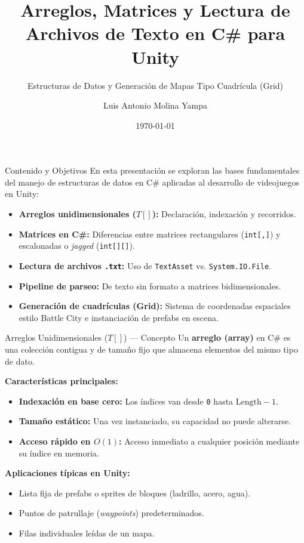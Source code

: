 \documentclass{beamer}
\title[Arreglos, Matrices y Archivos en C\#]{Arreglos, Matrices y Lectura de Archivos de Texto en C\# para Unity}
\subtitle{Estructuras de Datos y Generaci\'on de Mapas Tipo Cuadr\'icula (Grid)}
\author{Luis Antonio Molina Yampa}
\institute{COM200 - Programacion Avanzada}
\date{\today}
\begin{document}
\begin{frame}
  \titlepage
\end{frame}

\begin{frame}{Contenido y Objetivos}
  En esta presentaci\'on se exploran las bases fundamentales del manejo de estructuras de datos en C\# aplicadas al desarrollo de videojuegos en Unity:

  \vspace{0.3cm}
  \begin{itemize}
    \item \textbf{Arreglos unidimensionales ($T[]$):} Declaraci\'on, indexaci\'on y recorridos.
    \item \textbf{Matrices en C\#:} Diferencias entre matrices rectangulares (\texttt{int[,]}) y escalonadas o \textit{jagged} (\texttt{int[][]}).
    \item \textbf{Lectura de archivos \texttt{.txt}:} Uso de \texttt{TextAsset} vs. \texttt{System.IO.File}.
    \item \textbf{Pipeline de parseo:} De texto sin formato a matrices bidimensionales.
    \item \textbf{Generaci\'on de cuadr\'iculas (Grid):} Sistema de coordenadas espaciales estilo Battle City e instanciaci\'on de prefabs en escena.
  \end{itemize}
\end{frame}

\begin{frame}{Arreglos Unidimensionales ($T[]$) --- Concepto}
  Un \textbf{arreglo (array)} en C\# es una colecci\'on contigua y de tama\~no fijo que almacena elementos del mismo tipo de dato.

  \vspace{0.3cm}
  \textbf{Caracter\'isticas principales:}
  \begin{itemize}
    \item \textbf{Indexaci\'on en base cero:} Los \'indices van desde \texttt{0} hasta $\text{Length} - 1$.
    \item \textbf{Tama\~no est\'atico:} Una vez instanciado, su capacidad no puede alterarse.
    \item \textbf{Acceso r\'apido en $O(1)$:} Acceso inmediato a cualquier posici\'on mediante su \'indice en memoria.
  \end{itemize}

  \vspace{0.3cm}
  \textbf{Aplicaciones t\'ipicas en Unity:}
  \begin{itemize}
    \item Lista fija de prefabs o sprites de bloques (ladrillo, acero, agua).
    \item Puntos de patrullaje (\textit{waypoints}) predeterminados.
    \item Filas individuales le\'idas de un mapa.
  \end{itemize}
\end{frame}
\end{document}
